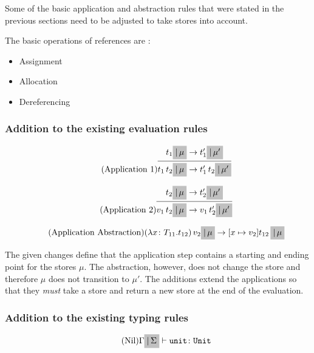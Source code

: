 Some of the basic application and abstraction rules that were stated in the previous
sections need to be adjusted to take stores into account.

The basic operations of references are \cite{pierce2002ProgLang}:

\begin{itemize}
    \item Assignment
    \item Allocation
    \item Dereferencing
\end{itemize}

\subsubsection{Addition to the existing evaluation rules \cite{pierce2002ProgLang}}
\begin{equation*}
    \tag{Application 1}
    \infer{
        t_1\,t_2 \colorbox{lightgray}{$|\,\mu$} \rightarrow t'_1\,t_2 \colorbox{lightgray}{$|\,\mu'$}
    }{
        t_1 \colorbox{lightgray}{$|\,\mu$} \rightarrow t'_1 \colorbox{lightgray}{$|\,\mu'$}
    }
\end{equation*}

\begin{equation*}
    \tag{Application 2}
    \infer{
        v_1\,t_2 \colorbox{lightgray}{$|\,\mu$} \rightarrow v_1\,t'_2 \colorbox{lightgray}{$|\,\mu'$}
    }{
        t_2 \colorbox{lightgray}{$|\,\mu$} \rightarrow t'_2 \colorbox{lightgray}{$|\,\mu'$}
    }
\end{equation*}

\begin{equation*}
    \tag{Application Abstraction}
    (\lambda x \colon T_{11} . t_{12})\,v_2 \colorbox{lightgray}{$|\,\mu$} \rightarrow [x \mapsto v_2] t_{12}\,\colorbox{lightgray}{$|\,\mu$}
\end{equation*}

The given changes define that the application step contains
a starting and ending point for the stores $\mu$. The
abstraction, however, does not change the store and therefore $\mu$ does
not transition to $\mu'$. The additions extend the applications so that
they \textit{must} take a store and return a new store at the end
of the evaluation.

\subsubsection{Addition to the existing typing rules \cite{pierce2002ProgLang}}
\begin{equation*}
    \tag{Nil}
    \Gamma \colorbox{lightgray}{$|\,\Sigma$} \vdash \texttt{unit} \colon \texttt{Unit}
\end{equation*}

